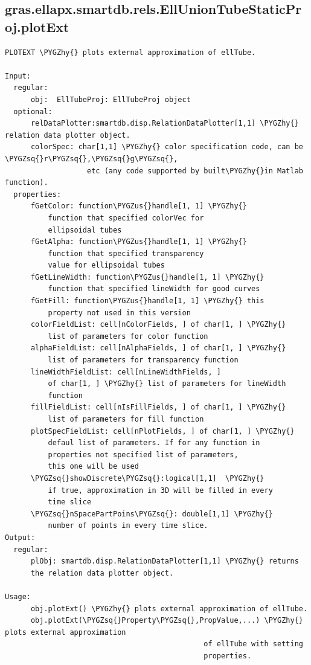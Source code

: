 \documentclass[letterpaper,10pt,english]{sphinxmanual}
\def\PYGZus{\char`\_}
\def\PYGZhy{\char`\-}
\def\PYGZsq{\char`\'}
\begin{document}
\subsection{gras.ellapx.smartdb.rels.EllUnionTubeStaticProj.plotExt}
\label{chap_functions:gras-ellapx-smartdb-rels-elluniontubestaticproj-plotext}
\begin{Verbatim}[commandchars=\\\{\}]
PLOTEXT \PYGZhy{} plots external approximation of ellTube.

Input:
  regular:
      obj:  EllTubeProj: EllTubeProj object
  optional:
      relDataPlotter:smartdb.disp.RelationDataPlotter[1,1] \PYGZhy{} relation data plotter object.
      colorSpec: char[1,1] \PYGZhy{} color specification code, can be \PYGZsq{}r\PYGZsq{},\PYGZsq{}g\PYGZsq{},
                   etc (any code supported by built\PYGZhy{}in Matlab function).
  properties:
      fGetColor: function\PYGZus{}handle[1, 1] \PYGZhy{}
          function that specified colorVec for
          ellipsoidal tubes
      fGetAlpha: function\PYGZus{}handle[1, 1] \PYGZhy{}
          function that specified transparency
          value for ellipsoidal tubes
      fGetLineWidth: function\PYGZus{}handle[1, 1] \PYGZhy{}
          function that specified lineWidth for good curves
      fGetFill: function\PYGZus{}handle[1, 1] \PYGZhy{} this
          property not used in this version
      colorFieldList: cell[nColorFields, ] of char[1, ] \PYGZhy{}
          list of parameters for color function
      alphaFieldList: cell[nAlphaFields, ] of char[1, ] \PYGZhy{}
          list of parameters for transparency function
      lineWidthFieldList: cell[nLineWidthFields, ]
          of char[1, ] \PYGZhy{} list of parameters for lineWidth
          function
      fillFieldList: cell[nIsFillFields, ] of char[1, ] \PYGZhy{}
          list of parameters for fill function
      plotSpecFieldList: cell[nPlotFields, ] of char[1, ] \PYGZhy{}
          defaul list of parameters. If for any function in
          properties not specified list of parameters,
          this one will be used
      \PYGZsq{}showDiscrete\PYGZsq{}:logical[1,1]  \PYGZhy{}
          if true, approximation in 3D will be filled in every
          time slice
      \PYGZsq{}nSpacePartPoins\PYGZsq{}: double[1,1] \PYGZhy{}
          number of points in every time slice.
Output:
  regular:
      plObj: smartdb.disp.RelationDataPlotter[1,1] \PYGZhy{} returns
      the relation data plotter object.

Usage:
      obj.plotExt() \PYGZhy{} plots external approximation of ellTube.
      obj.plotExt(\PYGZsq{}Property\PYGZsq{},PropValue,...) \PYGZhy{} plots external approximation
                                              of ellTube with setting
                                              properties.
\end{Verbatim}
\end{document}
